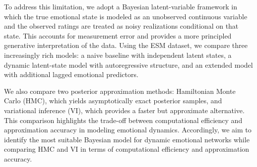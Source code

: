\documentclass[12pt,letterpaper,fleqn]{article}
\begin{document}


To address this limitation, we adopt a Bayesian latent-variable framework in which the true emotional state is modeled as an unobserved continuous variable and the observed ratings are treated as noisy realizations conditional on that state. This accounts for measurement error and provides a more principled generative interpretation of the data. Using the ESM dataset, we compare three increasingly rich models: a naive baseline with independent latent states, a dynamic latent-state model with autoregressive structure, and an extended model with additional lagged emotional predictors. 

We also compare two posterior approximation methods: Hamiltonian Monte Carlo (HMC), which yields asymptotically exact posterior samples, and variational inference (VI), which provides a faster but approximate alternative. This comparison highlights the trade-off between computational efficiency and approximation accuracy in modeling emotional dynamics. Accordingly, we aim to identify the most suitable Bayesian model for dynamic emotional networks while comparing HMC and VI in terms of computational efficiency and approximation accuracy.
\end{document}
